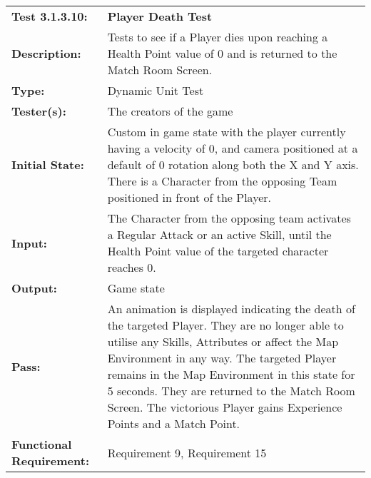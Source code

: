 \documentclass[12pt, titlepage]{article}
\begin{document}
\begin{mdframed}[linewidth=1pt]
\begin{tabularx}{\textwidth}{@{}p{3cm}X@{}}
{\bf Test 3.1.3.10:} & {\bf Player Death Test}\\[\baselineskip]
{\bf Description:} & Tests to see if a Player dies upon reaching a Health Point value of 0 and is returned to the Match Room Screen. \\[0.5\baselineskip]
{\bf Type:} & Dynamic Unit Test\\[0.5\baselineskip]
{\bf Tester(s):} & The creators of the game\\[0.5\baselineskip]
{\bf Initial State:} & Custom in game state with the player currently having a velocity of 0, and camera positioned at a default of 0 rotation along both the X and Y axis. There is a Character from the opposing Team positioned in front of the Player. \\[0.5\baselineskip]
{\bf Input:} & The Character from the opposing team activates a Regular Attack or an active Skill, until the Health Point value of the targeted character reaches 0. \\[0.5\baselineskip]
{\bf Output:} & Game state\\[0.5\baselineskip]
{\bf Pass:} & An animation is displayed indicating the death of the targeted Player. They are no longer able to utilise any Skills, Attributes or affect the Map Environment in any way. The targeted Player remains in the Map Environment in this state for 5 seconds. They are returned to the Match Room Screen. The victorious Player gains Experience Points and a Match Point. \\[0.5\baselineskip]
{\bf Functional Requirement:} & Requirement 9, Requirement 15
\end{tabularx}
\end{mdframed}
\end{document}
